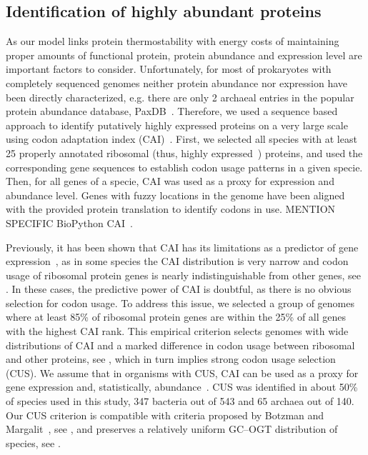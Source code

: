 \documentclass[10pt,letterpaper]{article}
\begin{document}
\subsection*{Identification of highly abundant proteins}
As our model links protein thermostability with energy costs of maintaining proper amounts of functional protein, protein abundance and expression level are important factors to consider. Unfortunately, for most of prokaryotes with completely sequenced genomes neither protein abundance nor expression have been directly characterized, e.g. there are only 2 archaeal entries in the popular protein abundance database, PaxDB~\cite{Wang2015Version}. Therefore, we used a sequence based approach to identify putatively highly expressed proteins on a very large scale using codon adaptation index (CAI)~\cite{Sharp1987The}.  First, we selected all species with at least 25 properly annotated ribosomal (thus, highly expressed~\cite{Pedersen1978Patterns,Srivastava1990Mechanism}) proteins, and used the corresponding gene sequences to establish codon usage patterns in a given specie. Then, for all genes of a specie, CAI was used as a proxy for expression and abundance level. Genes with fuzzy locations in the genome have been aligned with the provided protein translation to identify codons in use.
MENTION SPECIFIC BioPython CAI~\cite{Cock2009Biopython}. 

Previously, it has been shown that CAI has its limitations as a predictor of gene expression~\cite{Botzman2011Variation}, as in some species the CAI distribution is very narrow and codon usage of ribosomal protein genes is nearly indistinguishable from other genes, see . In these cases, the predictive power of CAI is doubtful, as there is no obvious selection for codon usage. To address this issue, we selected a group of genomes where at least 85\% of ribosomal protein genes are within the 25\% of all genes with the highest CAI rank. This empirical criterion selects genomes with wide distributions of CAI and a marked difference in codon usage between ribosomal and other proteins, see , which in turn implies strong codon usage selection (CUS). We assume that in organisms with CUS, CAI can be used as a proxy for gene expression and, statistically, abundance~\cite{Sharp1987The,Jansen2003Revisiting,Supek2005Comparison,Maier2009Correlation}. CUS was identified in about 50\% of species used in this study, 347 bacteria out of 543 and 65 archaea out of 140. Our CUS criterion is  compatible with  criteria proposed by Botzman and Margalit~\cite{Botzman2011Variation}, see , and preserves a relatively uniform GC--OGT distribution of species, see .
\end{document}
